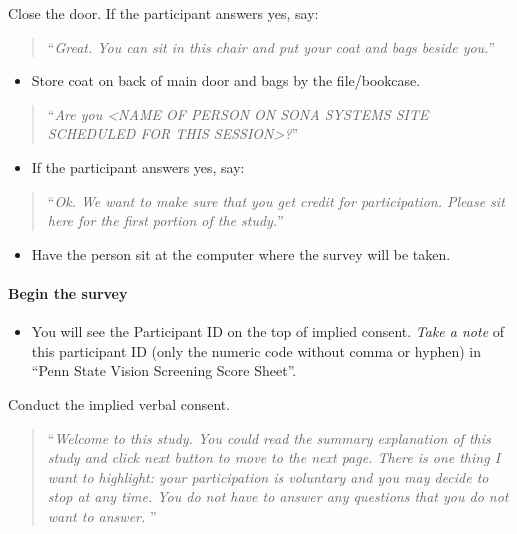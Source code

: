 \documentclass[]{article}
\providecommand{\tightlist}{%
  \setlength{\itemsep}{0pt}\setlength{\parskip}{0pt}}
\let\oldparagraph\paragraph
\renewcommand{\paragraph}[1]{\oldparagraph{#1}\mbox{}}
\begin{document}
Close the door. If the participant answers yes, say:

\begin{quote}
``\emph{Great. You can sit in this chair and put your coat and bags
beside you.}''
\end{quote}

\begin{itemize}
\tightlist
\item
  Store coat on back of main door and bags by the file/bookcase.
\end{itemize}

\begin{quote}
``\emph{Are you \textless{}NAME OF PERSON ON SONA SYSTEMS SITE SCHEDULED
FOR THIS SESSION\textgreater{}?}''
\end{quote}

\begin{itemize}
\tightlist
\item
  If the participant answers yes, say:
\end{itemize}

\begin{quote}
``\emph{Ok. We want to make sure that you get credit for participation.
Please sit here for the first portion of the study.}''
\end{quote}

\begin{itemize}
\tightlist
\item
  Have the person sit at the computer where the survey will be taken.
\end{itemize}

\paragraph{Begin the survey}\label{begin-the-survey}

\begin{itemize}
\tightlist
\item
  You will see the Participant ID on the top of implied consent.
  \emph{Take a note} of this participant ID (only the numeric code
  without comma or hyphen) in ``Penn State Vision Screening Score
  Sheet''.
\end{itemize}

Conduct the implied verbal consent.

\begin{quote}
``\emph{Welcome to this study. You could read the summary explanation of
this study and click next button to move to the next page. There is one
thing I want to highlight: your participation is voluntary and you may
decide to stop at any time. You do not have to answer any questions that
you do not want to answer. }''
\end{quote}
\end{document}
